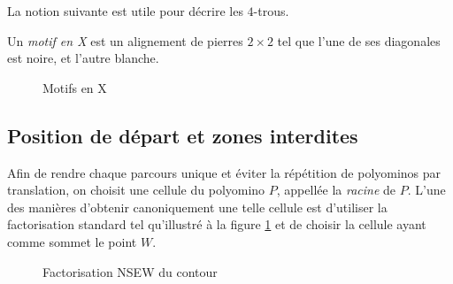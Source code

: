 La notion suivante est utile pour décrire les $4$-trous.

\begin{definition}
Un \emph{motif en X} est un alignement de pierres $2\times2$ tel que l'une de ses diagonales est noire, et l'autre blanche.
\end{definition}

\begin{figure}[h!]
\centering

\begin{subfigure}[b]{.4\textwidth}
\centering
{}
\end{subfigure}
\begin{subfigure}[b]{.4\textwidth}
\centering
{}
\end{subfigure}
\caption{Motifs en X}
\end{figure}

\subsection{Position de départ et zones interdites}

Afin de rendre chaque parcours unique et éviter la répétition de polyominos par translation, on choisit une cellule du polyomino $P$, appellée la \emph{racine} de $P$. L'une des manières d'obtenir canoniquement une telle cellule est d'utiliser la factorisation standard tel qu'illustré  à la figure \ref{fig:NSEW} et de choisir la cellule ayant comme sommet le point $W$.

\begin{figure}
\centering
\shorthandoff{:}
\caption{Factorisation NSEW du contour}\label{fig:NSEW}
\end{figure}

